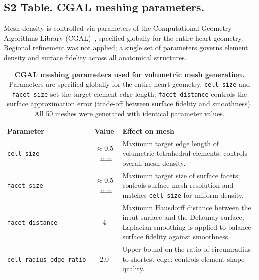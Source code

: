 \subsection*{S2 Table. CGAL meshing parameters.}

Mesh density is controlled via parameters of the Computational Geometry
Algorithms Library (CGAL)~\cite{cgal}, specified globally for the entire
heart geometry. Regional refinement was not applied; a single set of
parameters governs element density and surface fidelity across all
anatomical structures.

\begin{table}[htbp]
\centering
\caption{
    \textbf{CGAL meshing parameters used for volumetric mesh generation.}
    Parameters are specified globally for the entire heart geometry.
    \texttt{cell\_size} and \texttt{facet\_size} set the target element
    edge length; \texttt{facet\_distance} controls the surface approximation
    error (trade-off between surface fidelity and smoothness).
    All 50 meshes were generated with identical parameter values.
}
\begin{tabular}{lcp{7.5cm}}
\toprule
\textbf{Parameter} & \textbf{Value} & \textbf{Effect on mesh} \\
\midrule
\texttt{cell\_size} & $\approx 0.5$~mm
    & Maximum target edge length of volumetric tetrahedral elements;
      controls overall mesh density. \\
\texttt{facet\_size} & $\approx 0.5$~mm
    & Maximum target size of surface facets; controls surface mesh
      resolution and matches \texttt{cell\_size} for uniform density. \\
\texttt{facet\_distance} & $4$
    & Maximum Hausdorff distance between the input surface and the
      Delaunay surface; Laplacian smoothing is applied to balance
      surface fidelity against smoothness. \\
\texttt{cell\_radius\_edge\_ratio} & $2.0$
    & Upper bound on the ratio of circumradius to shortest edge;
      controls element shape quality. \\
\bottomrule
\end{tabular}
\label{tab:s2-cgal-params}
\end{table}
